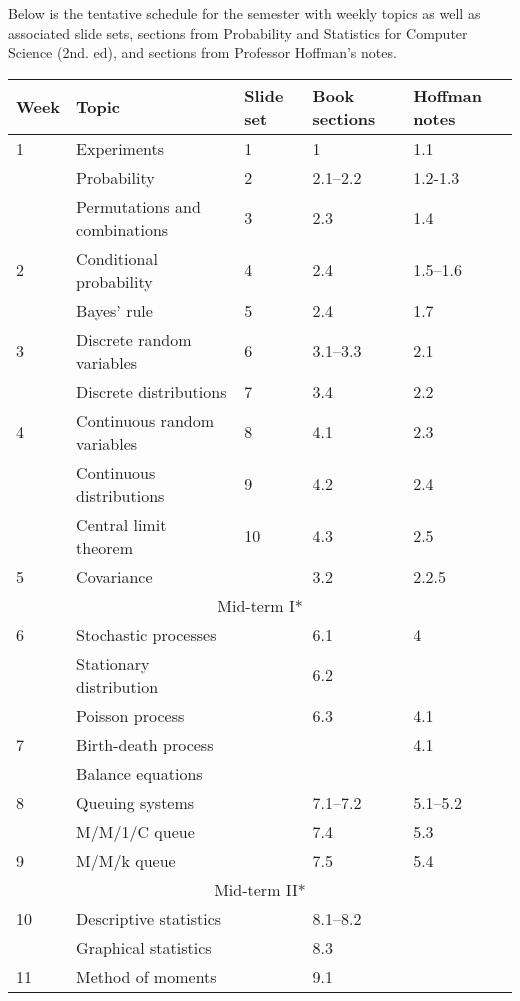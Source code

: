 \documentclass[10pt]{article}
\begin{document}
\pagestyle{fancy} 

Below is the tentative schedule for the semester with weekly topics as well as associated slide sets, sections from Probability and Statistics for Computer Science (2nd. ed), and sections from Professor Hoffman's notes.

\begin{center}
\begin{tabular}{|l|l|l|l|l|}
\hline
Week & Topic & Slide set & Book sections & Hoffman notes \\
\hline
1 & Experiments & 1 & 1 & 1.1 \\
& Probability & 2  & 2.1--2.2 & 1.2-1.3 \\
& Permutations and combinations & 3 & 2.3 & 1.4 \\
\hline
2 & Conditional probability & 4 & 2.4 & 1.5--1.6 \\
& Bayes' rule & 5 & 2.4 & 1.7 \\
\hline
3 & Discrete random variables & 6 & 3.1--3.3 & 2.1\\
& Discrete distributions & 7 & 3.4 & 2.2 \\
\hline
4 & Continuous random variables & 8 & 4.1 & 2.3 \\
& Continuous distributions & 9 & 4.2 & 2.4 \\
& Central limit theorem & 10 & 4.3 & 2.5 \\
\hline 
5 & Covariance &  & 3.2 & 2.2.5 \\
\hline
\hline
\multicolumn{5}{|c|}{Mid-term I*} \\
\hline
\hline
6 & Stochastic processes & & 6.1 & 4 \\
& Stationary distribution &  & 6.2 & \\
& Poisson process &  & 6.3 & 4.1 \\
\hline
7 & Birth-death process &   & & 4.1 \\
& Balance equations &  & & \\
\hline
8 & Queuing systems &  & 7.1--7.2 & 5.1--5.2 \\
& M/M/1/C queue &  & 7.4 & 5.3 \\
\hline
9 & M/M/k queue &  & 7.5 & 5.4 \\
\hline
\hline
\multicolumn{5}{|c|}{Mid-term II*} \\
\hline
\hline
10 & Descriptive statistics &  & 8.1--8.2 & \\
& Graphical statistics &  & 8.3 & \\
\hline 
11 & Method of moments &  & 9.1 & \\

\end{tabular}
\end{center}
\end{document}
